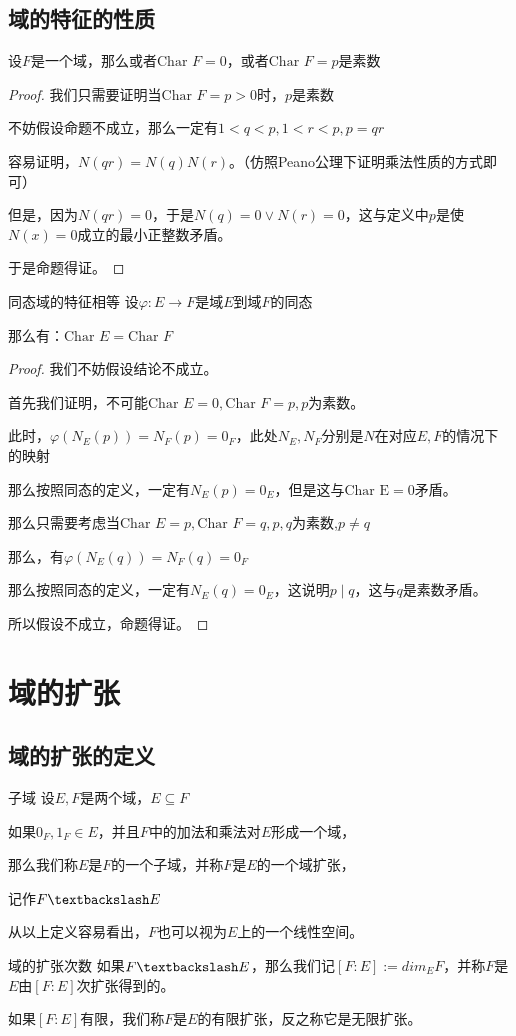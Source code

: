 \documentclass[12pt, a4paper, oneside, UTF8]{ctexbook}
\begin{document}
		\subsection{域的特征的性质}
			\begin{proposition}
				设$F$是一个域，那么或者$\text{Char }F=0$，或者$\text{Char }F =p$是素数
			\end{proposition}
			\begin{proof}
				我们只需要证明当$\text{Char }F =p>0$时，$p$是素数

				不妨假设命题不成立，那么一定有$1 < q < p,1 < r < p,p=qr$

				容易证明，$N(qr)=N(q)N(r)$。（仿照Peano公理下证明乘法性质的方式即可）

				但是，因为$N(qr)=0$，于是$N(q)=0 \vee N(r) = 0$，这与定义中$p$是使$N(x)=0$成立的最小正整数矛盾。

				于是命题得证。
			\end{proof}
			\begin{them}{同态域的特征相等}{}
				设$\varphi : E \to F$是域$E$到域$F$的同态

				那么有：$\text{Char }E = \text{Char }F$
			\end{them}
			\begin{proof}
				我们不妨假设结论不成立。

				首先我们证明，不可能$\text{Char }E =0, \text{Char }F = p,p$为素数。

				此时，$\varphi \left(N_E(p)\right)=N_F(p)=0_F$，此处$N_E,N_F$分别是$N$在对应$E,F$的情况下的映射

				那么按照同态的定义，一定有$N_E(p)=0_E$，但是这与$\text{Char E}=0$矛盾。

				那么只需要考虑当$\text{Char }E =p, \text{Char }F=q,p,q$为素数,$p \neq q$

				那么，有$\varphi \left(N_E(q)\right)=N_F(q)=0_F$

				那么按照同态的定义，一定有$N_E(q)=0_E$，这说明$p \mid q$，这与$q$是素数矛盾。

				所以假设不成立，命题得证。
			\end{proof}
	\section{域的扩张}
		\subsection{域的扩张的定义}
			\begin{defn}{子域}{}
				设$E,F$是两个域，$E \subseteq F$
				
				如果$0_F,1_F \in E$，并且$F$中的加法和乘法对$E$形成一个域，
				
				那么我们称$E$是$F$的一个子域，并称$F$是$E$的一个域扩张，
				
				记作$F\textbackslash E$
			\end{defn}
			从以上定义容易看出，$F$也可以视为$E$上的一个线性空间。
			\begin{defn}{域的扩张次数}{}
				如果$F\textbackslash E$，那么我们记$[F:E]:=dim_E F$，并称$F$是$E$由$[F:E]$次扩张得到的。

				如果$[F:E]$有限，我们称$F$是$E$的有限扩张，反之称它是无限扩张。
			\end{defn}
		
\end{document}

